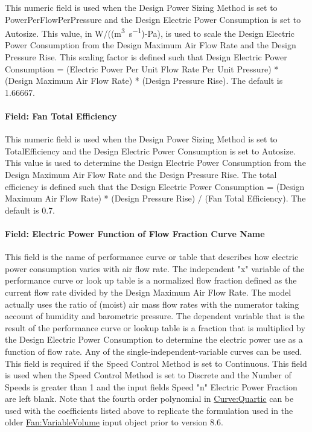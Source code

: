 This numeric field is used when the Design Power Sizing Method is set to PowerPerFlowPerPressure and the Design Electric Power Consumption is set to Autosize. This value, in W/((\si{\m\cubed\per\s})-Pa), is used to scale the Design Electric Power Consumption from the Design Maximum Air Flow Rate and the Design Pressure Rise. This scaling factor is defined such that Design Electric Power Consumption = (Electric Power Per Unit Flow Rate Per Unit Pressure) * (Design Maximum Air Flow Rate) * (Design Pressure Rise).  The default is 1.66667.

\paragraph{Field: Fan Total Efficiency}\label{field-total-efficiency-fansysmodel}

This numeric field is used when the Design Power Sizing Method is set to TotalEfficiency and the Design Electric Power Consumption is set to Autosize. This value is used to determine the Design Electric Power Consumption from the Design Maximum Air Flow Rate and the Design Pressure Rise.  The total efficiency is defined such that the Design Electric Power Consumption = (Design Maximum Air Flow Rate) * (Design Pressure Rise) / (Fan Total Efficiency).  The default is 0.7.

\paragraph{Field: Electric Power Function of Flow Fraction Curve Name}\label{field-power-curve-name-fansysmodel}

This field is the name of performance curve or table that describes how electric power consumption varies with air flow rate.  The independent "x" variable of the performance curve or look up table is a normalized flow fraction defined as the current flow rate divided by the Design Maximum Air Flow Rate.  The model actually uses the ratio of (moist) air mass flow rates with the numerator taking account of humidity and barometric pressure.  The dependent variable that is the result of the performance curve or lookup table is a fraction that is multiplied by the Design Electric Power Consumption to determine the electric power use as a function of flow rate.  Any of the single-independent-variable curves can be used. This field is required if the Speed Control Method is set to Continuous. This field is used when the Speed Control Method is set to Discrete and the Number of Speeds is greater than 1 and the input fields Speed "n" Electric Power Fraction are left blank.  Note that the fourth order polynomial in \hyperref[curvequartic]{Curve:Quartic} can be used with the coefficients listed above to replicate the formulation used in the older \hyperref[fanvariablevolume]{Fan:VariableVolume} input object prior to version 8.6.

